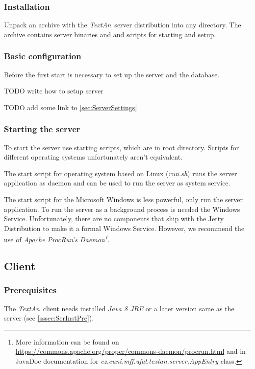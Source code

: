 \documentclass[12pt,a4paper]{report}
\newcommand{\textan}{\emph{TextAn}}
\begin{document}
\subsubsection{Installation}

Unpack an archive with the \textan\ server distribution into any directory. The archive contains server binaries and and scripts for starting and setup.

\subsubsection{Basic configuration}

Before the first start is necessary to set up the server and the database.

TODO write how to setup server

TODO add some link to \ref{sec:ServerSettings}

\subsubsection{Starting the server}

To start the server use starting scripts, which are in root directory. Scripts for different operating systems unfortunately aren't equivalent.

The start script for operating system based on Linux (\emph{run.sh}) runs the server application as daemon and can be used to run the server as system service.

The start script for the Microsoft Windows is less powerful, only run the server application. To run the server as a background process is needed the Windows Service. Unfortunately, there are no components that ship with the Jetty Distribution to make it a formal Windows Service. However, we recommend the use of \emph{Apache ProcRun's Daemon\footnote{More information can be found on \url{https://commons.apache.org/proper/commons-daemon/procrun.html} and in JavaDoc documentation for \emph{cz.cuni.mff.ufal.textan.server.AppEntry} class.}}.

\subsection{Client}

\subsubsection{Prerequisites}

The \textan\ client needs installed \emph{Java 8 JRE} or a later version same as the server (see \ref{sssec:SerInstPre}).
\end{document}
